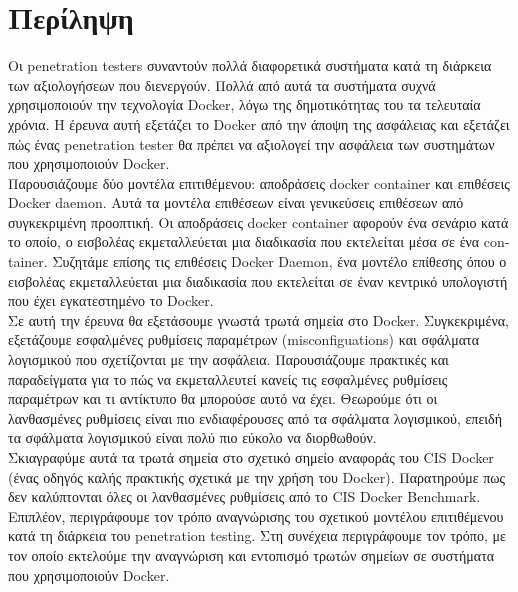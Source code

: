 \section{Περίληψη}
\label{Abstract}

Οι \textlatin{penetration testers} συναντούν πολλά διαφορετικά συστήματα
κατά τη διάρκεια των αξιολογήσεων που διενεργούν. Πολλά από αυτά τα συστήματα
συχνά χρησιμοποιούν την τεχνολογία \textlatin{Docker},
λόγω της δημοτικότητας του τα τελευταία χρόνια. Η έρευνα αυτή
εξετάζει το \textlatin{Docker} από την άποψη της ασφάλειας και εξετάζει πώς
ένας \textlatin{penetration tester} θα πρέπει να αξιολογεί την ασφάλεια των
συστημάτων που χρησιμοποιούν \textlatin{Docker}.\mbox{} \\

Παρουσιάζουμε δύο μοντέλα επιτιθέμενου: αποδράσεις \textlatin{docker container}
και επιθέσεις \textlatin{Docker daemon}. Αυτά τα μοντέλα επιθέσεων είναι
γενικεύσεις επιθέσεων από συγκεκριμένη προοπτική. Οι αποδράσεις
\textlatin{docker container} αφορούν ένα σενάριο κατά το οποίο, ο
εισβολέας εκμεταλλεύεται μια διαδικασία που εκτελείται μέσα
σε ένα \textlatin{container}. Συζητάμε επίσης τις επιθέσεις
\textlatin{Docker Daemon}, ένα μοντέλο επίθεσης όπου ο εισβολέας εκμεταλλεύεται
μια διαδικασία που εκτελείται σε έναν κεντρικό υπολογιστή που έχει
εγκατεστημένο το \textlatin{Docker}.\mbox{} \\

Σε αυτή την έρευνα θα εξετάσουμε γνωστά τρωτά σημεία στο \textlatin{Docker}.
Συγκεκριμένα, εξετάζουμε εσφαλμένες ρυθμίσεις παραμέτρων 
(\textlatin{misconfiguations}) και σφάλματα λογισμικού που
σχετίζονται με την ασφάλεια. Παρουσιάζουμε πρακτικές και παραδείγματα για το πώς
να εκμεταλλευτεί κανείς τις εσφαλμένες ρυθμίσεις παραμέτρων και τι
αντίκτυπο θα μπορούσε αυτό να έχει. Θεωρούμε ότι οι λανθασμένες ρυθμίσεις
είναι πιο ενδιαφέρουσες από τα σφάλματα λογισμικού, επειδή τα σφάλματα
λογισμικού είναι πολύ πιο εύκολο να διορθωθούν. \\

Σκιαγραφύμε αυτά τα τρωτά σημεία στο σχετικό σημείο αναφοράς του
\textlatin{CIS Docker} (ένας οδηγός καλής πρακτικής σχετικά με την χρήση του
\textlatin{Docker}). Παρατηρούμε πως δεν καλύπτονται όλες οι λανθασμένες
ρυθμίσεις από το \textlatin{CIS Docker Benchmark}.\mbox{} \\

Επιπλέον, περιγράφουμε τον τρόπο αναγνώρισης του σχετικού μοντέλου
επιτιθέμενου κατά τη διάρκεια του \textlatin{penetration testing}.
Στη συνέχεια περιγράφουμε τον τρόπο, με τον οποίο εκτελούμε την αναγνώριση
και εντοπισμό τρωτών σημείων σε συστήματα που χρησιμοποιούν
\textlatin{Docker}.\mbox{} \\

